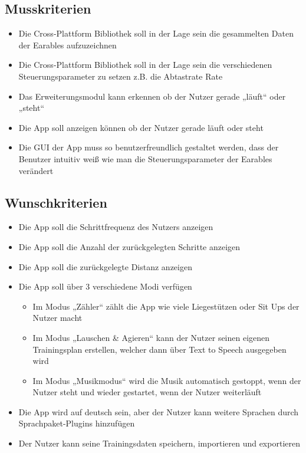 \documentclass[a4paper,12pt]{article}
\begin{document}
\subsection{Musskriterien}

  \begin{itemize}
    \item\text Die Cross-Plattform Bibliothek soll in der Lage sein die gesammelten Daten der Earables aufzuzeichnen
    \item\text Die Cross-Plattform Bibliothek soll in der Lage sein die verschiedenen Steuerungsparameter zu setzen z.B. die Abtastrate Rate
    \item\text Das Erweiterungsmodul kann erkennen ob der Nutzer gerade „läuft“ oder „steht“
    \item\text Die App soll anzeigen können ob der Nutzer gerade läuft oder steht
    \item\text Die GUI der App muss so benutzerfreundlich gestaltet werden, dass der Benutzer intuitiv weiß wie man die Steuerungsparameter der Earables verändert
  \end{itemize}
\subsection{Wunschkriterien}
  \begin{itemize}
    \item\text Die App soll die Schrittfrequenz des Nutzers anzeigen
    \item\text Die App soll die Anzahl der zurückgelegten Schritte anzeigen
    \item\text Die App soll die zurückgelegte Distanz anzeigen
    \item\text Die App soll über 3 verschiedene Modi verfügen
      \begin{itemize}
        \item\text Im Modus „Zähler“  zählt die App wie viele Liegestützen oder Sit Ups der Nutzer macht
        \item\text  Im Modus „Lauschen \& Agieren“ kann der Nutzer seinen eigenen Trainingsplan erstellen, welcher dann über Text to Speech ausgegeben wird
        \item\text  Im Modus „Musikmodus“ wird die Musik automatisch gestoppt, wenn der Nutzer steht und wieder gestartet, wenn der Nutzer weiterläuft
      \end{itemize}
    \item\text Die App wird auf deutsch sein, aber der Nutzer kann weitere Sprachen durch Sprachpaket-Plugins hinzufügen
    \item\text Der Nutzer kann seine Trainingsdaten speichern, importieren und exportieren
  \end{itemize}
\end{document}
